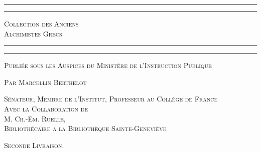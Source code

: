 \documentclass[a4paper, 11pt, oneside, polutonikogreek, french]{article}
\begin{document}
\begin{titlepage} %
	\centering %

	
	\rule{\textwidth}{1.6pt}\vspace*{-\baselineskip}\vspace*{2pt} %
	\rule{\textwidth}{0.4pt} %
	
	\vspace{1\baselineskip} %
	
	{\scshape\Huge Collection des Anciens \\ Alchimistes Grecs}
	
	\vspace{1\baselineskip} %

	\rule{\textwidth}{0.4pt}\vspace*{-\baselineskip}\vspace{3.2pt} %
	\rule{\textwidth}{1.6pt} %
	
	\vspace{1\baselineskip} %
	
	
	{\scshape \normalsize Publiée sous les Auspices du Ministère de l'Instruction Publique}
	
	{\scshape Par \Large Marcellin Berthelot} %
	
	\vspace*{1\baselineskip} %
	
        {\scshape\scriptsize Sénateur, Membre de l'Institut, Professeur au Collège de France \\Avec la Collaboration de \\\large M. Ch.-Em. Ruelle,\\\scriptsize Bibliothécaire a la Bibliothèque Sainte-Geneviève} %
  
        \vspace{4\baselineskip}
  
	{\scshape \normalsize Seconde Livraison.} %
  


\end{titlepage}
\end{document}
